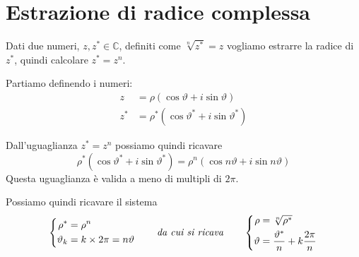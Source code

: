 \documentclass[../../dimostrazioni]{subfiles}
\begin{document}
    \chapter{Estrazione di radice complessa}

        Dati due numeri, \(z, z^* \in \mathbb{C}\), definiti come \(\sqrt[n]{z^*} = z\) vogliamo estrarre la radice
        di \(z^*\), quindi calcolare \(z^* = z^n\).

        Partiamo definendo i numeri:
        \begin{align*}
            z &= \rho (\cos \vartheta + i \sin \vartheta)\\
            z^* &= \rho^* (\cos \vartheta^* + i \sin \vartheta^*)
        \end{align*}

        Dall'uguaglianza \(z^* = z^n\) possiamo quindi ricavare
        \[
            \rho^* (\cos \vartheta^* + i \sin \vartheta^*) = \rho^n (\cos n\vartheta + i \sin n\vartheta)
        \]
        Questa uguaglianza è valida a meno di multipli di \(2\pi\).

        Possiamo quindi ricavare il sistema
        \[
            \left\{
                \begin{aligned}
                    \rho^* &= \rho^n\\
                    \vartheta_k &= k \times 2\pi = n\vartheta
                \end{aligned}
            \right.
            \qquad \text{\emph{da cui si ricava}} \qquad
            \left\{
                \begin{aligned}
                    \rho &= \sqrt[n]{\rho^*}\\
                    \vartheta &= \frac{\vartheta^*}{n} + k \frac{2\pi}{n}
                \end{aligned}
            \right.
        \]
\end{document}
